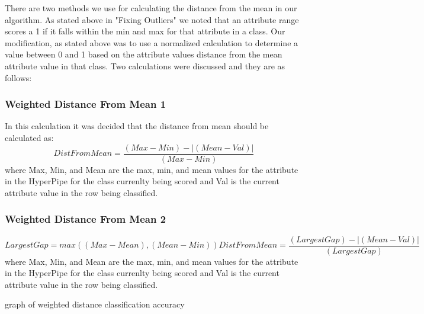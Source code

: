 There are two methods we use for calculating the distance from 
the mean in our algorithm. As stated above in "Fixing Outliers" 
we noted that an attribute range scores a 1 if it falls within 
the min and max for that attribute in a class. Our modification, 
as stated above was to use a normalized calculation to determine 
a value between 0 and 1 based on the attribute values distance 
from the mean attribute value in that class. Two calculations 
were discussed and they are as follows:
\subsubsection{Weighted Distance From Mean 1}
In this calculation it was decided that the distance from mean 
should be calculated as:
\begin{equation}
  DistFromMean=\frac{(Max-Min)-|(Mean-Val)|}{(Max-Min)}
\end{equation}
where Max, Min, and Mean are the max, min, and mean values for 
the attribute in the HyperPipe for the class currenlty being 
scored and Val is the current attribute value in the row being 
classified.
\subsubsection{Weighted Distance From Mean 2}
\begin{equation}
  LargestGap = max((Max-Mean),(Mean-Min))
  DistFromMean=\frac{(LargestGap)-|(Mean-Val)|}{(LargestGap)}
\end{equation}
where Max, Min, and Mean are the max, min, and mean values for 
the attribute in the HyperPipe for the class currenlty being 
scored and Val is the current attribute value in the row being 
classified.



graph of weighted distance classification accuracy

